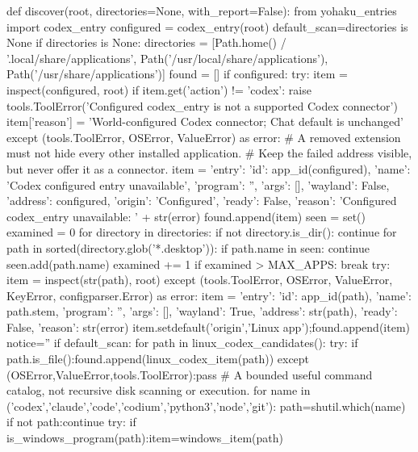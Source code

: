 def discover(root, directories=None, with_report=False):
    from yohaku_entries import codex_entry
    configured = codex_entry(root)
    default_scan=directories is None
    if directories is None:
        directories = [Path.home() / '.local/share/applications', Path('/usr/local/share/applications'), Path('/usr/share/applications')]
    found = []
    if configured:
        try:
            item = inspect(configured, root)
            if item.get('action') != 'codex':
                raise tools.ToolError('Configured codex_entry is not a supported Codex connector')
            item['reason'] = 'World-configured Codex connector; Chat default is unchanged'
        except (tools.ToolError, OSError, ValueError) as error:
            # A removed extension must not hide every other installed application.
            # Keep the failed address visible, but never offer it as a connector.
            item = {'entry': {'id': app_id(configured),
                             'name': 'Codex configured entry unavailable',
                             'program': '', 'args': [], 'wayland': False},
                    'address': configured, 'origin': 'Configured', 'ready': False,
                    'reason': 'Configured codex_entry unavailable: ' + str(error)}
        found.append(item)
    seen = set()
    examined = 0
    for directory in directories:
        if not directory.is_dir():
            continue
        for path in sorted(directory.glob('*.desktop')):
            if path.name in seen:
                continue
            seen.add(path.name)
            examined += 1
            if examined > MAX_APPS:
                break
            try:
                item = inspect(str(path), root)
            except (tools.ToolError, OSError, ValueError, KeyError, configparser.Error) as error:
                item = {'entry': {'id': app_id(path), 'name': path.stem, 'program': '', 'args': [], 'wayland': True},
                        'address': str(path), 'ready': False, 'reason': str(error)}
            item.setdefault('origin','Linux app');found.append(item)
    notice=''
    if default_scan:
        for path in linux_codex_candidates():
            try:
                if path.is_file():found.append(linux_codex_item(path))
            except (OSError,ValueError,tools.ToolError):pass
        # A bounded useful command catalog, not recursive disk scanning or execution.
        for name in ('codex','claude','code','codium','python3','node','git'):
            path=shutil.which(name)
            if not path:continue
            try:
                if is_windows_program(path):item=windows_item(path)
